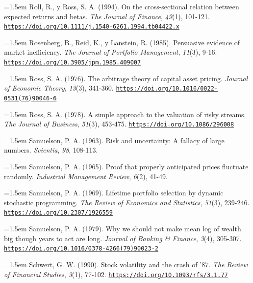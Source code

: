 \documentclass[10pt,a4paper]{article}
\begin{document}
\noindent\hangindent=1.5em Roll, R., y Ross, S. A. (1994). On the cross-sectional relation between expected returns and betas. \textit{The Journal of Finance}, \textit{49}(1), 101-121. \href{https://doi.org/10.1111/j.1540-6261.1994.tb04422.x}{\nolinkurl{https://doi.org/10.1111/j.1540-6261.1994.tb04422.x}}

\noindent\hangindent=1.5em Rosenberg, B., Reid, K., y Lanstein, R. (1985). Persuasive evidence of market inefficiency. \textit{The Journal of Portfolio Management}, \textit{11}(3), 9-16. \href{https://doi.org/10.3905/jpm.1985.409007}{\nolinkurl{https://doi.org/10.3905/jpm.1985.409007}}

\noindent\hangindent=1.5em Ross, S. A. (1976). The arbitrage theory of capital asset pricing. \textit{Journal of Economic Theory}, \textit{13}(3), 341-360. \href{https://doi.org/10.1016/0022-0531(76)90046-6}{\nolinkurl{https://doi.org/10.1016/0022-0531(76)90046-6}}

\noindent\hangindent=1.5em Ross, S. A. (1978). A simple approach to the valuation of risky streams. \textit{The Journal of Business}, \textit{51}(3), 453-475. \href{https://doi.org/10.1086/296008}{\nolinkurl{https://doi.org/10.1086/296008}}

\noindent\hangindent=1.5em Samuelson, P. A. (1963). Risk and uncertainty: A fallacy of large numbers. \textit{Scientia}, \textit{98}, 108-113.

\noindent\hangindent=1.5em Samuelson, P. A. (1965). Proof that properly anticipated prices fluctuate randomly. \textit{Industrial Management Review}, \textit{6}(2), 41-49.

\noindent\hangindent=1.5em Samuelson, P. A. (1969). Lifetime portfolio selection by dynamic stochastic programming. \textit{The Review of Economics and Statistics}, \textit{51}(3), 239-246. \href{https://doi.org/10.2307/1926559}{\nolinkurl{https://doi.org/10.2307/1926559}}

\noindent\hangindent=1.5em Samuelson, P. A. (1979). Why we should not make mean log of wealth big though years to act are long. \textit{Journal of Banking \& Finance}, \textit{3}(4), 305-307. \href{https://doi.org/10.1016/0378-4266(79)90023-2}{\nolinkurl{https://doi.org/10.1016/0378-4266(79)90023-2}}

\noindent\hangindent=1.5em Schwert, G. W. (1990). Stock volatility and the crash of '87. \textit{The Review of Financial Studies}, \textit{3}(1), 77-102. \href{https://doi.org/10.1093/rfs/3.1.77}{\nolinkurl{https://doi.org/10.1093/rfs/3.1.77}}
\end{document}
